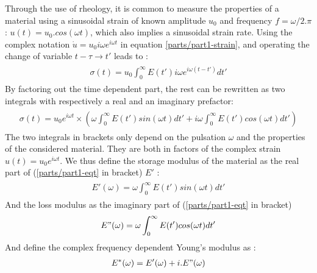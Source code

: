 \documentclass[A4paperpaper,11pt,english]{sphinxmanual}
\begin{document}
Through the use of rheology, it is common to measure the properties of a material using a
sinusoidal strain of known amplitude \(u_0\) and frequency \(f =
\omega/ 2.\pi\) : \(u(t) = u_0.cos(\omega t)\), which also implies a
sinusoidal strain rate. Using the complex notation \(\dot u = u_0 i\omega
e^{i\omega t}\) in equation \eqref{parts/part1-strain}, and operating the change of variable \(t-\tau \to t'\)  leads to :
\label{parts/part1:equation-eqa13}\begin{gather}
\begin{split}\sigma(t) = u_0\int_0^\infty E(t') i\omega e^{i\omega(t-t')}dt'\end{split}\label{parts/part1-eqa13}
\end{gather}
By factoring out the time dependent part, the rest can be rewritten as two integrals with respectively a real and an imaginary prefactor:
\label{parts/part1:equation-eqt}\begin{gather}
\begin{split}\sigma(t) = u_0e^{i\omega t}\times\left(
          \omega \int_0^\infty E(t')  sin(\omega t) dt'
          +
        i \omega \int_0^\infty E(t') cos(\omega t) dt'
\right)\end{split}\label{parts/part1-eqt}
\end{gather}
The two integrals in brackets only depend on the pulsation \(\omega\) and the properties of the considered material.
They are both in factors of the complex strain \(u(t) = u_0 e^{i\omega t}\).
We thus define the storage modulus of the material as the real part of (\eqref{parts/part1-eqt} in bracket) \(E'\) :
\label{parts/part1:equation-eqa14}\begin{gather}
\begin{split}E'(\omega) =  \omega \int_0^\infty E(t')  sin(\omega t) dt'\end{split}\label{parts/part1-eqa14}
\end{gather}
And the loss modulus as the imaginary part of (\eqref{parts/part1-eqt} in bracket)
\label{parts/part1:equation-eqa15}\begin{gather}
\begin{split}E"(\omega) =  \omega \int_0^\infty E(t')  cos(\omega t) dt'\end{split}\label{parts/part1-eqa15}
\end{gather}
And define the complex frequency dependent Young's modulus as :
\label{parts/part1:equation-eqa16}\begin{gather}
\begin{split}E^*(\omega) = E'(\omega) + i.E"(\omega)\end{split}\label{parts/part1-eqa16}
\end{gather}
\end{document}

